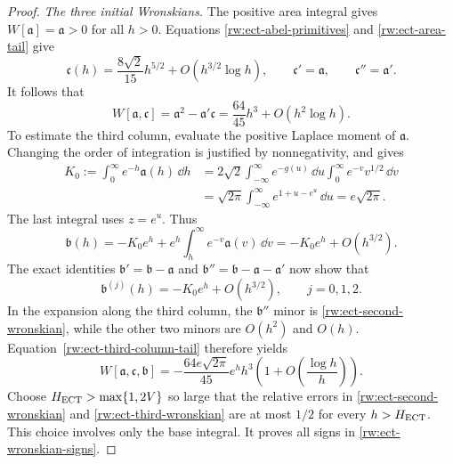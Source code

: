 \begin{proof}
\smallskip
\noindent\emph{The three initial Wronskians.}
The positive area integral gives $W[\mathfrak a]=\mathfrak a>0$
for all $h>0$. Equations \eqref{rw:ect-abel-primitives} and
\eqref{rw:ect-area-tail} give
\[
 \mathfrak c(h)=\frac{8\sqrt2}{15}h^{5/2}
                   +O(h^{3/2}\log h),\qquad
 \mathfrak c'=\mathfrak a,\qquad \mathfrak c''=\mathfrak a'.
\]
It follows that
\begin{equation}\label{rw:ect-second-wronskian}
 W[\mathfrak a,\mathfrak c]
   =\mathfrak a^2-\mathfrak a'\mathfrak c
   =\frac{64}{45}h^3+O(h^2\log h).
\end{equation}
To estimate the third column, evaluate the positive Laplace moment
of $\mathfrak a$. Changing the order of integration is justified
by nonnegativity, and gives
\begin{equation}\label{rw:ect-laplace-moment}
 \begin{aligned}
 K_0:=\int_0^\infty e^{-h}\mathfrak a(h)\,\dd h
 &=2\sqrt2\int_{-\infty}^{\infty}e^{-g(u)}\,\dd u
                       \int_0^\infty e^{-v}v^{1/2}\,\dd v\\
 &=\sqrt{2\pi}\int_{-\infty}^{\infty}e^{1+u-e^u}\,\dd u
   =e\sqrt{2\pi}.
 \end{aligned}
\end{equation}
The last integral uses $z=e^u$. Thus
\[
 \mathfrak b(h)=-K_0e^h
                 +e^h\int_h^\infty e^{-v}\mathfrak a(v)\,\dd v
              =-K_0e^h+O(h^{3/2}).
\]
The exact identities $\mathfrak b'=\mathfrak b-\mathfrak a$ and
$\mathfrak b''=\mathfrak b-\mathfrak a-\mathfrak a'$ now show that
\begin{equation}\label{rw:ect-third-column-tail}
 \mathfrak b^{(j)}(h)=-K_0e^h+O(h^{3/2}),\qquad j=0,1,2.
\end{equation}
In the expansion along the third column, the $\mathfrak b''$
minor is \eqref{rw:ect-second-wronskian}, while the other two minors
are $O(h^2)$ and $O(h)$. Equation~\eqref{rw:ect-third-column-tail}
therefore yields
\begin{equation}\label{rw:ect-third-wronskian}
 W[\mathfrak a,\mathfrak c,\mathfrak b]
 =-\frac{64e\sqrt{2\pi}}{45}e^hh^3
       \left(1+O\left(\frac{\log h}{h}\right)\right).
\end{equation}
Choose $H_{\rm ECT}>\max\{1,2V\}$ so large that the relative
errors in \eqref{rw:ect-second-wronskian} and
\eqref{rw:ect-third-wronskian} are at most $1/2$ for every
$h>H_{\rm ECT}$. This choice involves only the base integral.
It proves all signs in \eqref{rw:ect-wronskian-signs}.


\end{proof}
